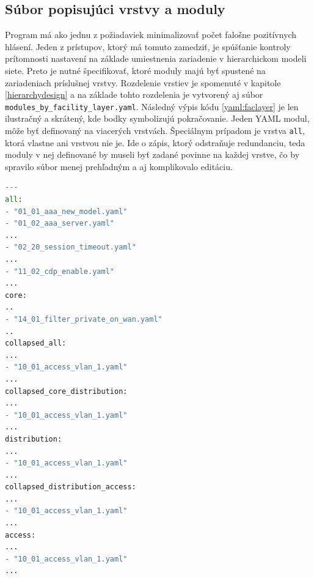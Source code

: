 \subsection{Súbor popisujúci vrstvy a moduly}
Program má ako jednu z požiadaviek minimalizovať počet falošne pozitívnych hlásení. Jeden z prístupov, ktorý má tomuto zamedziť, je spúšťanie kontroly prítomnosti nastavení  na základe umiestnenia zariadenie v hierarchickom modeli siete. Preto je nutné špecifikovať, ktoré moduly majú byť spustené na zariadeniach príslušnej vrstvy. Rozdelenie vrstiev je spomenuté v kapitole \ref{hierarchydesign} a na základe tohto rozdelenia je vytvorený aj súbor \texttt{modules\_by\_facility\_layer.yaml}. Následný výpis kódu \ref{yaml:faclayer} je len ilustračný a skrátený, kde bodky symbolizujú pokračovanie. Jeden YAML modul, môže byť definovaný na viacerých vrstvách. Špeciálnym prípadom je vrstva \texttt{all}, ktorá vlastne ani vrstvou nie je. Ide o zápis, ktorý odstraňuje redundanciu, teda moduly v nej definované by museli byť zadané povinne na každej vrstve, čo by spravilo súbor menej prehľadným a aj komplikovalo editáciu.

\begin{lstlisting}[frame=single,numbers=right,caption={Skrátený konfiguračný súbor \texttt{modules\_by\_facility\_layer.yaml}, ktorý popisuje, aké moduly môžu byť spúšťané na jednotlivých vrstvách.},label=yaml:faclayer,basicstyle=\ttfamily\small, keywordstyle=\color{black},language=python,breaklines=true]
---
all:
- "01_01_aaa_new_model.yaml"
- "01_02_aaa_server.yaml"
...
- "02_20_session_timeout.yaml"
...
- "11_02_cdp_enable.yaml"
...
core: 
..
- "14_01_filter_private_on_wan.yaml"
..
collapsed_all:
...
- "10_01_access_vlan_1.yaml"
...
collapsed_core_distribution:
...
- "10_01_access_vlan_1.yaml"
...
distribution: 
...
- "10_01_access_vlan_1.yaml"
...
collapsed_distribution_access:
...
- "10_01_access_vlan_1.yaml"
...
access: 
...
- "10_01_access_vlan_1.yaml"
...

\end{lstlisting}

